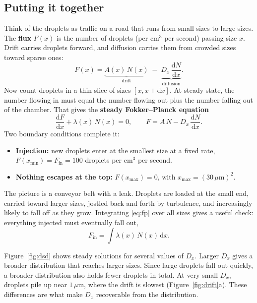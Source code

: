 \documentclass[11pt]{article}
\newcommand{\um}{\,\mu\mathrm{m}}
\newcommand{\Fin}{F_{\mathrm{in}}}
\newcommand{\dd}{\mathrm{d}}
\begin{document}
\subsection{Putting it together}
Think of the droplets as traffic on a road that runs from small sizes to large sizes. The \textbf{flux} $F(x)$ is the number of droplets (per cm$^3$ per second) passing size $x$. Drift carries droplets forward, and diffusion carries them from crowded sizes toward sparse ones:
\begin{equation}\label{eq:flux}
F(x) = \underbrace{A(x)\,N(x)}_{\text{drift}} \;-\; \underbrace{D_x\,\frac{\dd N}{\dd x}}_{\text{diffusion}} .
\end{equation}
Now count droplets in a thin slice of sizes $[x, x+\dd x]$. At steady state, the number flowing in must equal the number flowing out plus the number falling out of the chamber. That gives the \textbf{steady Fokker--Planck equation}
\begin{equation}\label{eq:fp}
\boxed{\;\frac{\dd F}{\dd x} + \lambda(x)\,N(x) = 0, \qquad F = A\,N - D_x\,\frac{\dd N}{\dd x}.\;}
\end{equation}
Two boundary conditions complete it:
\begin{itemize}
\item \textbf{Injection:} new droplets enter at the smallest size at a fixed rate, $F(x_{\min}) = \Fin = 100$ droplets per cm$^3$ per second.
\item \textbf{Nothing escapes at the top:} $F(x_{\max}) = 0$, with $x_{\max} = (30\um)^2$.
\end{itemize}
The picture is a conveyor belt with a leak. Droplets are loaded at the small end, carried toward larger sizes, jostled back and forth by turbulence, and increasingly likely to fall off as they grow. Integrating \eqref{eq:fp} over all sizes gives a useful check: everything injected must eventually fall out,
\begin{equation}\label{eq:balance}
\Fin = \int \lambda(x)\,N(x)\,\dd x .
\end{equation}

Figure~\ref{fig:dsd} shows steady solutions for several values of $D_x$. Larger $D_x$ gives a broader distribution that reaches larger sizes. Since large droplets fall out quickly, a broader distribution also holds fewer droplets in total. At very small $D_x$, droplets pile up near $1\um$, where the drift is slowest (Figure~\ref{fig:drift}a). These differences are what make $D_x$ recoverable from the distribution.
\end{document}
